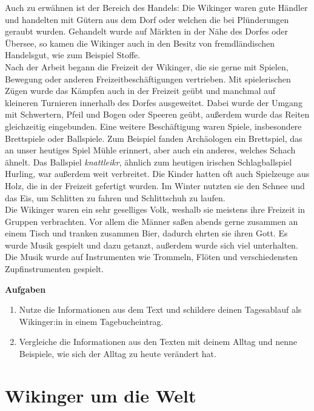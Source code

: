 \documentclass[12pt,a4paper,ngerman,openany]{book}
\newcommand{\aufgaben}[1]{
  \begin{tcolorbox}
    \textbf{Aufgaben}
    \begin{enumerate}
      #1
    \end{enumerate}
  \end{tcolorbox}
} %
\newcommand{\fchapter}[1]{\chapter{#1}\thispagestyle{chapterstyle}}
\begin{document}
Auch zu erwähnen ist der Bereich des Handels: Die Wikinger waren gute Händler und handelten mit Gütern aus dem Dorf oder welchen die bei Plünderungen geraubt wurden. Gehandelt wurde auf Märkten in der Nähe des Dorfes oder Übersee, so kamen die Wikinger auch in den Besitz von fremdländischen Handelsgut, wie zum Beispiel Stoffe.\\
Nach der Arbeit begann die Freizeit der Wikinger, die sie gerne mit Spielen, Bewegung oder anderen Freizeitbeschäftigungen vertrieben.
Mit spielerischen Zügen wurde das Kämpfen auch in der Freizeit geübt und manchmal auf kleineren Turnieren innerhalb des Dorfes ausgeweitet. Dabei wurde der Umgang mit Schwertern, Pfeil und Bogen oder Speeren geübt, außerdem wurde das Reiten gleichzeitig eingebunden. Eine weitere Beschäftigung waren Spiele, insbesondere Brettspiele oder Ballspiele. Zum Beispiel fanden Archäologen ein Brettspiel, das an unser heutiges Spiel \glqq Mühle\grqq{} erinnert, aber auch ein anderes, welches Schach ähnelt. Das Ballspiel \textit{knattleikr}, ähnlich zum heutigen irischen Schlagballspiel \glqq Hurling\grqq{}, war außerdem weit verbreitet. Die Kinder hatten oft auch Spielzeuge aus Holz, die in der Freizeit gefertigt wurden. Im Winter nutzten sie den Schnee und das Eis, um Schlitten zu fahren und Schlittschuh zu laufen.\\
Die Wikinger waren ein sehr geselliges Volk, weshalb sie meistens ihre Freizeit in Gruppen verbrachten.
Vor allem die Männer saßen abends gerne zusammen an einem Tisch und tranken zusammen Bier, dadurch ehrten sie ihren Gott. Es wurde Musik gespielt und dazu getanzt, außerdem wurde sich viel unterhalten. Die Musik wurde auf Instrumenten wie Trommeln, Flöten und verschiedensten Zupfinstrumenten gespielt.

\vspace{0.66cm}

\aufgaben{
  \item Nutze die Informationen aus dem Text und schildere deinen Tagesablauf als Wikinger:in in einem Tagebucheintrag.
  \item Vergleiche die Informationen aus den Texten mit deinem Alltag und nenne Beispiele, wie sich der Alltag zu heute verändert hat.
}

\fchapter{Wikinger um die Welt}
\end{document}
